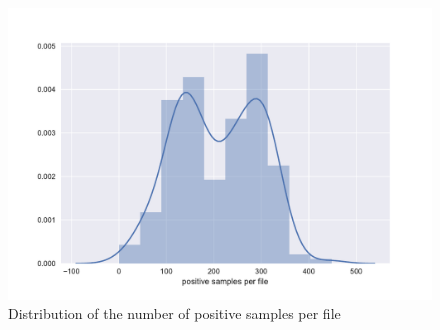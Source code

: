 \begin{figure}[htbp]
  \centering
  \includegraphics[width=\textwidth]{figures/distribution.pdf}
  \caption{Distribution of the number of positive samples per file}
  \label{fig:data_dist}
\end{figure}

